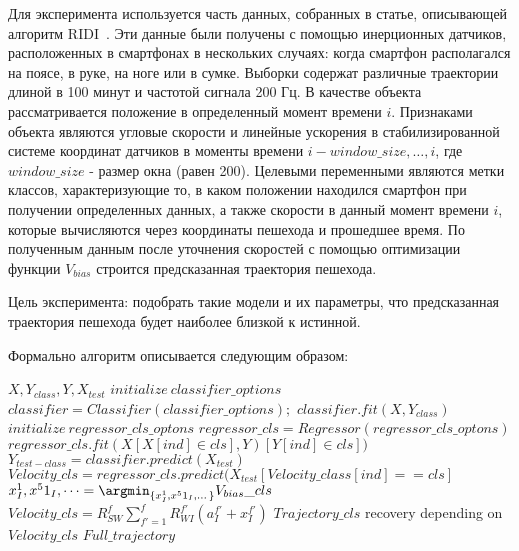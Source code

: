 \documentclass[12pt,twoside]{article}
\begin{document}
Для эксперимента используется часть данных, собранных в статье, описывающей алгоритм RIDI~\cite{journals/corr/abs-1712-09004}. Эти данные были получены с помощью инерционных датчиков, расположенных в смартфонах в нескольких случаях: когда смартфон располагался на поясе, в руке, на ноге или в сумке. Выборки содержат различные траектории длиной в 100 минут и частотой сигнала 200 Гц. В качестве объекта рассматривается положение в определенный момент времени $i$. Признаками объекта являются угловые скорости и линейные ускорения в стабилизированной системе координат датчиков в моменты времени $i-window\_size, \dots, i$, где $window\_size$ - размер окна (равен 200). Целевыми переменными являются метки классов, характеризующие то, в каком положении находился смартфон при получении определенных данных, а также скорости в данный момент времени $i$, которые вычисляются через координаты пешехода и прошедшее время. По полученным данным после уточнения скоростей с помощью оптимизации функции  $V_{bias}$ строится предсказанная траектория пешехода.

Цель эксперимента: подобрать такие модели и их параметры, что предсказанная траектория пешехода будет наиболее близкой к истинной.


Формально алгоритм описывается следующим образом: 

\begin{algorithmic}[1]
    \REQUIRE $X, Y_{class}, Y, X_{test}$
    \STATE $initialize ~ classifier\_options$
    \STATE $classifier = Classifier(classifier\_options);$
    \STATE $classifier.fit(X, Y_{class})$
    \STATE $initialize ~ regressor\_cls\_optons$
    \STATE $regressor\_cls = Regressor(regressor\_cls\_optons)$
    \STATE $regressor\_cls.fit(X[X[ind] \in cls], Y)[Y[ind] \in cls])$
    \ENDFOR
    \STATE $Y_{test-class} = classifier.predict(X_{test})$
    \STATE $Velocity\_cls = regressor\_cls.predict(X_{test}
    [Velocity\_class[ind] == cls]$
    \STATE $x^1_I, x^51_I,\dots = \argmin_{\{x^1_I, x^51_I,\dots\}}V_{bias}\_cls$
    \STATE $Velocity\_cls = R_{SW}^f\sum_{f'=1}^f R_{WI}^{f'}(a_I^{f'}+x_I^{f'})$
    \STATE $Trajectory\_cls$ recovery depending on $Velocity\_cls$
    \ENDFOR
    \RETURN $Full\_trajectory$
\end{algorithmic}



\end{document}
